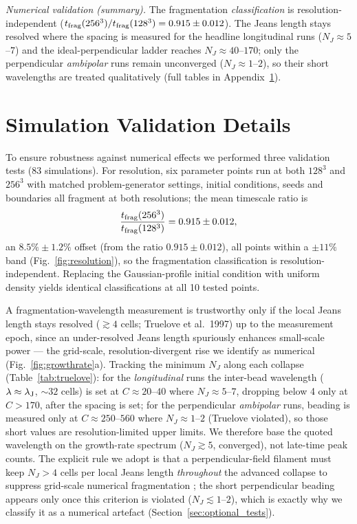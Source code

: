 \documentclass[usenatbib,twoside,twocolumn]{mnras}
\begin{document}
\emph{Numerical validation (summary).} The fragmentation \emph{classification} is resolution-independent ($t_{\rm frag}(256^3)/t_{\rm frag}(128^3)=0.915\pm0.012$). The Jeans length stays resolved where the spacing is measured for the headline longitudinal runs ($N_J\approx5$--$7$) and the ideal-perpendicular ladder reaches $N_J\approx40$--$170$; only the perpendicular \emph{ambipolar} runs remain unconverged ($N_J\approx1$--$2$), so their short wavelengths are treated qualitatively (full tables in Appendix~\ref{sec:validation}).


\section{Simulation Validation Details}
\label{sec:validation}

To ensure robustness against numerical effects we performed three validation tests (83 simulations). For resolution, six parameter points run at both $128^3$ and $256^3$ with matched problem-generator settings, initial conditions, seeds and boundaries all fragment at both resolutions; the mean timescale ratio is
\begin{equation}
\frac{t_{\rm frag}(256^3)}{t_{\rm frag}(128^3)} = 0.915 \pm 0.012,
\end{equation}
an $8.5\%\pm1.2\%$ offset (from the ratio $0.915\pm0.012$), all points within a $\pm11\%$ band (Fig.~\ref{fig:resolution}), so the fragmentation classification is resolution-independent. Replacing the Gaussian-profile initial condition with uniform density yields identical classifications at all 10 tested points.

A fragmentation-wavelength measurement is trustworthy only if the local Jeans length stays resolved ($\gtrsim4$ cells; Truelove et al.\ 1997) up to the measurement epoch, since an under-resolved Jeans length spuriously enhances small-scale power --- the grid-scale, resolution-divergent rise we identify as numerical (Fig.~\ref{fig:growthrate}a). Tracking the minimum $N_J$ along each collapse (Table~\ref{tab:truelove}): for the \emph{longitudinal} runs the inter-bead wavelength ($\lambda\approx\lambda_{\rm J}$, $\sim32$ cells) is set at $C\approx20$--$40$ where $N_J\approx5$--$7$, dropping below 4 only at $C>170$, after the spacing is set; for the perpendicular \emph{ambipolar} runs, beading is measured only at $C\approx250$--$560$ where $N_J\approx1$--$2$ (Truelove violated), so those short values are resolution-limited upper limits. We therefore base the quoted wavelength on the growth-rate spectrum ($N_J\gtrsim5$, converged), not late-time peak counts. The explicit rule we adopt is that a perpendicular-field filament must keep $N_J>4$ cells per local Jeans length \emph{throughout} the advanced collapse to suppress grid-scale numerical fragmentation \citep{Truelove1997}; the short perpendicular beading appears only once this criterion is violated ($N_J\lesssim1$--$2$), which is exactly why we classify it as a numerical artefact (Section~\ref{sec:optional_tests}).
\end{document}
